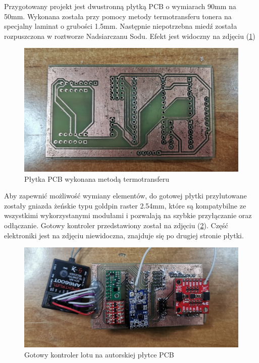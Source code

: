 \documentclass[12pt, a4paper]{article}
\let\oldref\ref
\renewcommand{\ref}[1]{(\oldref{#1})}
\begin{document}
Przygotowany projekt jest dwustronną płytką PCB o wymiarach 90mm na 50mm. Wykonana została przy pomocy metody termotransferu tonera na specjalny laminat o grubości 1.5mm. Następnie niepotrzebna miedź została rozpuszczona w roztworze Nadsiarczanu Sodu. Efekt jest widoczny na zdjęciu \ref{fig:stara}
 
  \begin{figure}[ht]
    \centering
    \includegraphics[width=1\textwidth]{pcb}
    \caption{Płytka PCB wykonana metodą termotransferu}
    \label{fig:stara}
\end{figure}

Aby zapewnić możliwość wymiany elementów, do gotowej płytki przylutowane zostały gniazda żeńskie typu goldpin raster 2.54mm, które są kompatybilne ze wszystkimi wykorzystanymi modułami i pozwalają na szybkie przyłączanie oraz odłączanie. Gotowy kontroler przedstawiony został na zdjęciu \ref{fig:starycaly}. Część elektroniki jest na zdjęciu niewidoczna, znajduje się po drugiej stronie płytki.

\begin{figure}[ht]
    \centering
    \includegraphics[width=1\textwidth]{kontorolerstary}
    \caption{Gotowy kontroler lotu na autorskiej płytce PCB}
    \label{fig:starycaly}
\end{figure}
\end{document}
